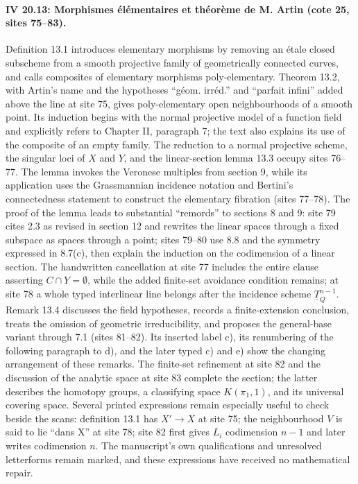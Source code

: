 \paragraph{IV 20.13: Morphismes élémentaires et théorème de M. Artin (cote 25, sites 75--83).}
Definition 13.1 introduces elementary morphisms by removing an étale closed subscheme from a smooth projective family of geometrically connected curves, and calls composites of elementary morphisms poly-elementary. Theorem 13.2, with Artin's name and the hypotheses ``géom. irréd.'' and ``parfait infini'' added above the line at site 75, gives poly-elementary open neighbourhoods of a smooth point. Its induction begins with the normal projective model of a function field and explicitly refers to Chapter II, paragraph 7; the text also explains its use of the composite of an empty family. The reduction to a normal projective scheme, the singular loci of $X$ and $Y$, and the linear-section lemma 13.3 occupy sites 76--77. The lemma invokes the Veronese multiples from section 9, while its application uses the Grassmannian incidence notation and Bertini's connectedness statement to construct the elementary fibration (sites 77--78). The proof of the lemma leads to substantial ``remords'' to sections 8 and 9: site 79 cites 2.3 as revised in section 12 and rewrites the linear spaces through a fixed subspace as spaces through a point; sites 79--80 use 8.8 and the symmetry expressed in 8.7(c), then explain the induction on the codimension of a linear section. The handwritten cancellation at site 77 includes the entire clause asserting $C\cap Y=\emptyset$, while the added finite-set avoidance condition remains; at site 78 a whole typed interlinear line belongs after the incidence scheme $\underline{T}^{n-1}_Q$. Remark 13.4 discusses the field hypotheses, records a finite-extension conclusion, treats the omission of geometric irreducibility, and proposes the general-base variant through 7.1 (sites 81--82). Its inserted label c), its renumbering of the following paragraph to d), and the later typed c) and e) show the changing arrangement of these remarks. The finite-set refinement at site 82 and the discussion of the analytic space at site 83 complete the section; the latter describes the homotopy groups, a classifying space $K(\pi_1,1)$, and its universal covering space. Several printed expressions remain especially useful to check beside the scans: definition 13.1 has $X'\to X$ at site 75; the neighbourhood $V$ is said to lie ``dans X'' at site 78; site 82 first gives $L_i$ codimension $n-1$ and later writes codimension $n$. The manuscript's own qualifications and unresolved letterforms remain marked, and these expressions have received no mathematical repair.
